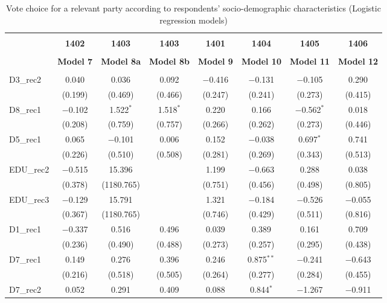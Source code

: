 \documentclass[
]{article}
\begin{document}
\begin{table}[!htbp] \centering 
  \caption{Vote choice for a relevant party according to respondents' 
                       socio-demographic characteristics (Logistic regression models)} 
  \label{table:full_logit_ie} 
\begin{tabular}{@{\extracolsep{5pt}}lccccccc} 
\\[-1.8ex]\hline \\[-1.8ex] 
 & \textbf{1402} & \textbf{1403} & \textbf{1403} & \textbf{1401} & \textbf{1404} & \textbf{1405} & \textbf{1406} \\ 
\\[-1.8ex] & \textbf{Model 7} & \textbf{Model 8a} & \textbf{Model 8b} & \textbf{Model 9} & \textbf{Model 10} & \textbf{Model 11} & \textbf{Model 12}\\ 
\hline \\[-1.8ex] 
 D3\_rec2 & 0.040 & 0.036 & 0.092 & $-$0.416 & $-$0.131 & $-$0.105 & 0.290 \\ 
  & (0.199) & (0.469) & (0.466) & (0.247) & (0.241) & (0.273) & (0.415) \\ 
  D8\_rec1 & $-$0.102 & 1.522$^{*}$ & 1.518$^{*}$ & 0.220 & 0.166 & $-$0.562$^{*}$ & 0.018 \\ 
  & (0.208) & (0.759) & (0.757) & (0.266) & (0.262) & (0.273) & (0.446) \\ 
  D5\_rec1 & 0.065 & $-$0.101 & 0.006 & 0.152 & $-$0.038 & 0.697$^{*}$ & 0.741 \\ 
  & (0.226) & (0.510) & (0.508) & (0.281) & (0.269) & (0.343) & (0.513) \\ 
  EDU\_rec2 & $-$0.515 & 15.396 &  & 1.199 & $-$0.663 & 0.288 & 0.038 \\ 
  & (0.378) & (1180.765) &  & (0.751) & (0.456) & (0.498) & (0.805) \\ 
  EDU\_rec3 & $-$0.129 & 15.791 &  & 1.321 & $-$0.184 & $-$0.526 & $-$0.055 \\ 
  & (0.367) & (1180.765) &  & (0.746) & (0.429) & (0.511) & (0.816) \\ 
  D1\_rec1 & $-$0.337 & 0.516 & 0.496 & 0.039 & 0.389 & 0.161 & 0.709 \\ 
  & (0.236) & (0.490) & (0.488) & (0.273) & (0.257) & (0.295) & (0.438) \\ 
  D7\_rec1 & 0.149 & 0.276 & 0.396 & 0.246 & 0.875$^{**}$ & $-$0.241 & $-$0.643 \\ 
  & (0.216) & (0.518) & (0.505) & (0.264) & (0.277) & (0.284) & (0.455) \\ 
  D7\_rec2 & 0.052 & 0.291 & 0.409 & 0.088 & 0.844$^{*}$ & $-$1.267 & $-$0.911 \\ 

\end{tabular}
\end{table}
\end{document}
